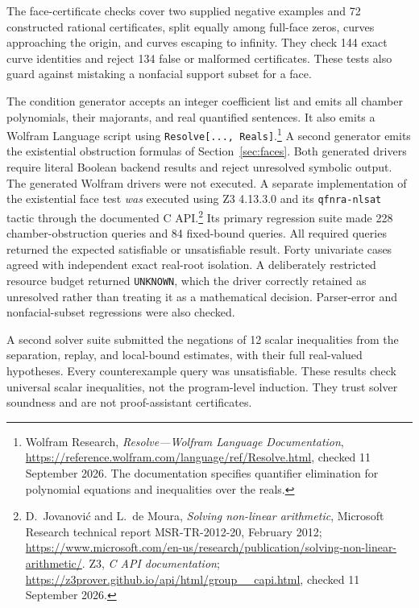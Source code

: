 \documentclass[11pt,a4paper]{article}
\theoremstyle{definition}
\theoremstyle{remark}
\begin{document}
The face-certificate checks cover two supplied negative examples and 72
constructed rational certificates, split equally among full-face zeros,
curves approaching the origin, and curves escaping to infinity. They check
144 exact curve identities and reject 134 false or malformed certificates.
These tests also guard against mistaking a nonfacial support subset for a face.

The condition generator accepts an integer coefficient list and emits all
chamber polynomials, their majorants, and real quantified sentences. It also
emits a Wolfram Language script using \texttt{Resolve[..., Reals]}.\footnote{\label{fn:wolfram}
Wolfram Research, \emph{Resolve---Wolfram Language Documentation},
\url{https://reference.wolfram.com/language/ref/Resolve.html}, checked
11 September 2026. The documentation specifies quantifier elimination for
polynomial equations and inequalities over the reals.}
A second generator emits the existential obstruction formulas of
Section~\ref{sec:faces}. Both generated drivers require literal Boolean
backend results and reject unresolved symbolic output.
The generated Wolfram drivers were not executed. A separate implementation
of the existential face test \emph{was} executed using Z3 4.13.3.0 and its
\texttt{qfnra-nlsat} tactic through the documented C API.\footnote{\label{fn:z3}
D.~Jovanovi\'c and L.~de Moura, \emph{Solving non-linear arithmetic},
Microsoft Research technical report MSR-TR-2012-20, February 2012;
\url{https://www.microsoft.com/en-us/research/publication/solving-non-linear-arithmetic/}.
Z3, \emph{C API documentation};
\url{https://z3prover.github.io/api/html/group__capi.html}, checked 11 September 2026.}
Its primary regression suite made 228 chamber-obstruction queries and 84
fixed-bound queries. All required queries returned the expected satisfiable
or unsatisfiable result. Forty univariate cases agreed with independent exact
real-root isolation. A deliberately restricted resource budget returned
\texttt{UNKNOWN}, which the driver correctly retained as unresolved rather
than treating it as a mathematical decision. Parser-error and nonfacial-subset
regressions were also checked.

A second solver suite submitted the negations of 12 scalar inequalities from
the separation, replay, and local-bound estimates, with their full real-valued
hypotheses. Every counterexample query was unsatisfiable. These results check
universal scalar inequalities, not the program-level induction. They trust
solver soundness and are not proof-assistant certificates.
\end{document}
